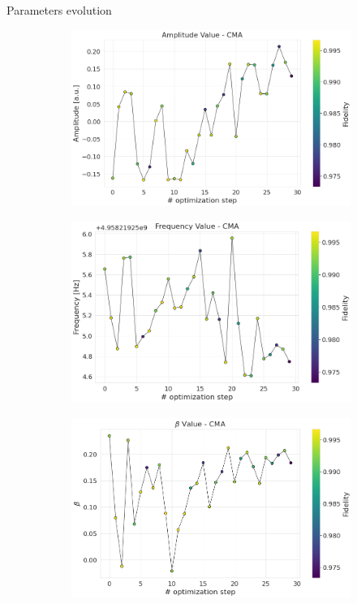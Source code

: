 \documentclass[aspectratio=169,10pt]{beamer}
\begin{document}
\begin{frame}[t,fragile]{Parameters evolution}
\begin{figure}
  \end{figure}
    \begin{figure}
    \begin{subfigure}[t]{0.315\textwidth}
      \includegraphics[width=\textwidth]{figures/CMA_amplitude.png}
    \end{subfigure}
        \begin{subfigure}[t]{0.315\textwidth}
      \includegraphics[width=\textwidth]{figures/CMA_frequency.png}
    \end{subfigure}
        \begin{subfigure}[t]{0.315\textwidth}
      \includegraphics[width=\textwidth]{figures/CMA_beta.png}
    \end{subfigure}
  \end{figure}
\end{frame}
\end{document}
